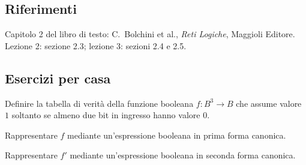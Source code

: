 \documentclass[11pt,a4paper]{article}
\begin{document}
\subsection*{Riferimenti}

Capitolo 2 del libro di testo: C.\ Bolchini et al., \emph{Reti Logiche},
Maggioli Editore. Lezione 2: sezione 2.3; lezione 3: sezioni 2.4 e 2.5.

\subsection*{Esercizi per casa}

\begin{esercizio}
Definire la tabella di verità della funzione booleana $f \colon B^3 \to B$ che
assume valore $1$ soltanto se almeno due bit in ingresso hanno valore $0$.
\end{esercizio}
\begin{esercizio}
Rappresentare $f$ mediante un'espressione booleana in prima forma canonica.
\end{esercizio}
\begin{esercizio}
Rappresentare $f'$ mediante un'espressione booleana in seconda forma canonica.
\end{esercizio}
\end{document}
